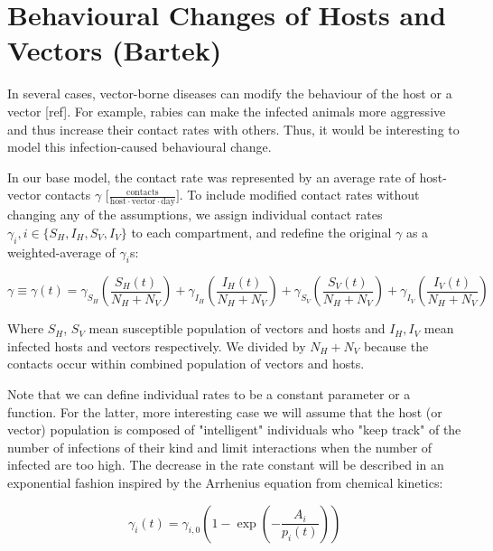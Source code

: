 \begingroup
\setlength{\parindent}{0pt}
\setlength{\parskip}{0.5\baselineskip}
\section{Behavioural Changes of Hosts and Vectors (Bartek)}
In several cases, vector-borne diseases can modify the behaviour of the host or a vector [ref]. For example, rabies can make the infected animals more aggressive and thus increase their contact rates with others. Thus, it would be interesting to model this infection-caused behavioural change. 

In our base model, the contact rate was represented by an average rate of host-vector contacts $\gamma \, \, \mathrm{[\frac{contacts}{host \cdot vector \cdot day}}]$. To include modified contact rates without changing any of the assumptions, we assign individual contact rates $\gamma_i, i \in\{S_H, I_H, S_V, I_V\}$ to each compartment, and redefine the original $\gamma$ as a weighted-average of $\gamma_i$s:

\begin{equation}
    \gamma \equiv\gamma(t) = \gamma_{S_H} \left( \frac{S_H(t)}{N_H+ N_V}  \right) + \gamma_{I_H} \left( \frac{I_H(t)}{N_H + N_V} \right) + \gamma_{S_V} \left( \frac{S_V(t)}{N_H + N_V} \right) + \gamma_{I_V} \left( \frac{I_V(t)}{N_H + N_V} \right)
\end{equation}

Where $S_H$, $S_V$ mean susceptible population of vectors and hosts and $I_H, I_V$ mean infected hosts and vectors respectively. We divided by $N_H + N_V$ because the contacts occur within combined population of vectors and hosts. 


Note that we can define individual rates to be a constant parameter or a function. For the latter, more interesting case we will assume that the host 
(or vector) population is composed of "intelligent" individuals who "keep track" of the number of infections of their kind and limit interactions when the number of infected are too high. The decrease in the rate constant will be described in an exponential fashion inspired by the Arrhenius equation from chemical kinetics:

\begin{equation}
\gamma_i(t) = \gamma_{i, 0}\left(1 - \exp{\left({-\frac{A_i}{p_i(t)}}\right)} \right)
\end{equation}

